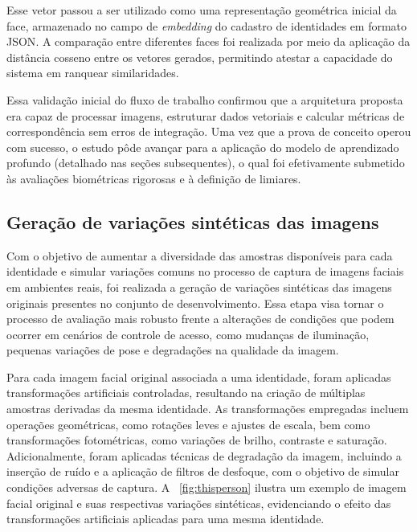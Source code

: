 Esse vetor passou a ser utilizado como uma representação geométrica inicial da face, armazenado no campo de \textit{embedding} do cadastro de identidades em formato \acs{JSON}. A comparação entre diferentes faces foi realizada por meio da aplicação da distância cosseno entre os vetores gerados, permitindo atestar a capacidade do sistema em ranquear similaridades.

Essa validação inicial do fluxo de trabalho confirmou que a arquitetura proposta era capaz de processar imagens, estruturar dados vetoriais e calcular métricas de correspondência sem erros de integração. Uma vez que a prova de conceito operou com sucesso, o estudo pôde avançar para a aplicação do modelo de aprendizado profundo (detalhado nas seções subsequentes), o qual foi efetivamente submetido às avaliações biométricas rigorosas e à definição de limiares.


\subsection{Geração de variações sintéticas das imagens}

Com o objetivo de aumentar a diversidade das amostras disponíveis para cada identidade e simular variações comuns no processo de captura de imagens faciais em ambientes reais, foi realizada a geração de variações sintéticas das imagens originais presentes no conjunto de desenvolvimento. Essa etapa visa tornar o processo de avaliação mais robusto frente a alterações de condições que podem ocorrer em cenários de controle de acesso, como mudanças de iluminação, pequenas variações de pose e degradações na qualidade da imagem.

Para cada imagem facial original associada a uma identidade, foram aplicadas transformações artificiais controladas, resultando na criação de múltiplas amostras derivadas da mesma identidade. As transformações empregadas incluem operações geométricas, como rotações leves e ajustes de escala, bem como transformações fotométricas, como variações de brilho, contraste e saturação. Adicionalmente, foram aplicadas técnicas de degradação da imagem, incluindo a inserção de ruído e a aplicação de filtros de desfoque, com o objetivo de simular condições adversas de captura. A ~\ref{fig:thisperson} ilustra um exemplo de imagem facial original e suas respectivas variações sintéticas, evidenciando o efeito das transformações artificiais aplicadas para uma mesma identidade.


